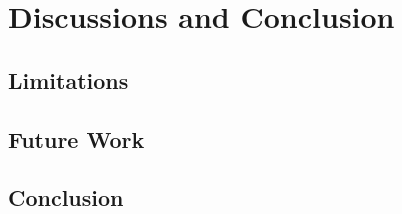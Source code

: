 \documentclass[english]{tktltiki2}
\theoremstyle{definition}
\theoremstyle{remark}
\begin{document}
\section{Discussions and Conclusion}\label{sec:conclusion} %
\subsection{Limitations} %
\subsection{Future Work} %
\subsection{Conclusion} %

%
%




% 



\end{document}
